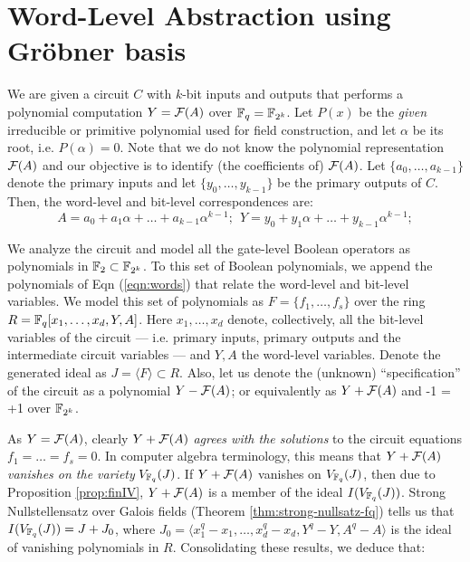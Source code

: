 \section{Word-Level Abstraction using Gr\"obner basis}
\label{sec:theory}
We are given a circuit $C$ with $k$-bit inputs and outputs that
performs a polynomial computation $Y = {\mathcal{F}}(A)$ over ${\mathbb{F}}_{q} = {\mathbb{F}}_{2^k}$. Let
$P(x)$ be the {\it given} irreducible or primitive polynomial used for
field construction, and let $\alpha$ be its root, i.e. $P(\alpha) = 0
$. Note that we do not know the polynomial representation
${\mathcal{F}}(A)$ and our objective is to identify (the coefficients of)
${\mathcal{F}}(A)$. Let $\{a_0, \dots, a_{k-1}\}$ denote the primary inputs and
let $\{y_0, \dots, y_{k-1}\}$ be the primary outputs of $C$. Then, the
word-level and bit-level correspondences are: 
\begin{equation}
\label{eqn:words}
 A = a_0 + a_1 \alpha + \dots + a_{k-1} \alpha^{k-1}; ~~ Y = y_0 +
y_1 \alpha + \dots + y_{k-1} \alpha^{k-1};
\end{equation}

We analyze the circuit and model all the gate-level Boolean operators
as polynomials in ${\mathbb{F}}_2 \subset {\mathbb{F}}_{2^k}$. To this set of
Boolean polynomials, we append the polynomials of Eqn
(\ref{eqn:words}) that relate the word-level and bit-level
variables. We model this set of polynomials as $F = \{f_1, \dots,
f_s\}$ over the ring $R = {\mathbb{F}}_{q}[x_1, \dots, x_d, Y, A]$. Here $x_1,
\dots, x_d$ denote, collectively, all the bit-level variables of the
circuit --- i.e. primary inputs, primary outputs and the intermediate
circuit variables --- and $Y, A$ the word-level variables. Denote the
generated ideal as $J = \langle F \rangle \subset R$. Also, let us
denote the (unknown) ``specification'' of the circuit as a polynomial 
$Y - {\mathcal{F}}(A)$; or equivalently as $Y + {\mathcal{F}}(A)$ and -1 = +1 over ${\mathbb{F}}_{2^k}$.

As $Y = {\mathcal{F}}(A)$, clearly $Y + {\mathcal{F}}(A)$ {\it  agrees with the solutions}
to the circuit equations $f_1 = \dots = f_s = 0$. In computer 
algebra terminology, this means that $Y + {\mathcal{F}}(A)$ {\it vanishes on the
  variety}  $V_{{\mathbb{F}}_{q}}(J)$. If $Y + {\mathcal{F}}(A)$ vanishes on $V_{{\mathbb{F}}_{q}}(J)$,
then due to Proposition \ref{prop:finIV}, $Y + {\mathcal{F}}(A)$ is a member of
the ideal $I(V_{{\mathbb{F}}_{q}}(J))$. Strong Nullstellensatz over Galois fields
(Theorem \ref{thm:strong-nullsatz-fq}) tells us that $I(V_{{\mathbb{F}}_{q}}(J)) =
J + J_0$, where $J_0 = \langle x_1^q - x_1, \dots, x_d^q - x_d, Y^q -
Y, A^q - A \rangle$ is the ideal of vanishing polynomials in
$R$. Consolidating these results, we deduce that:

